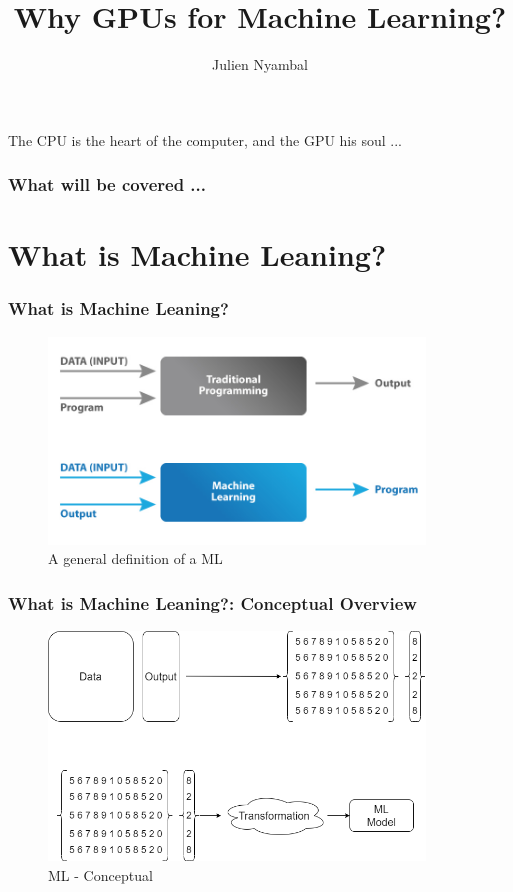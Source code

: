 \documentclass[11pt]{beamer}
\begin{document}
	\author{Julien Nyambal}
	\title{Why GPUs for Machine Learning?}
	\begin{frame}[plain]
		\maketitle
	\end{frame}

\begin{frame}
	\centering
	The CPU is the heart of the computer, and the GPU his soul ...
\end{frame}

	\begin{frame}
		\frametitle{What will be covered ...}
		\tableofcontents
	\end{frame}

\section{What is Machine Leaning?}
\begin{frame}
	\frametitle{What is Machine Leaning?}
	\begin{figure}
		\includegraphics[width=100mm,scale=0.7]{ml}
		\caption{A general definition of a ML}
	\end{figure}
\end{frame}

\begin{frame}
	\frametitle{What is Machine Leaning?: Conceptual Overview}
	\begin{figure}
	\includegraphics[width=100mm,scale=0.7]{ml_concept}
	\caption{ML - Conceptual}
\end{figure}
\end{frame}
\end{document}
